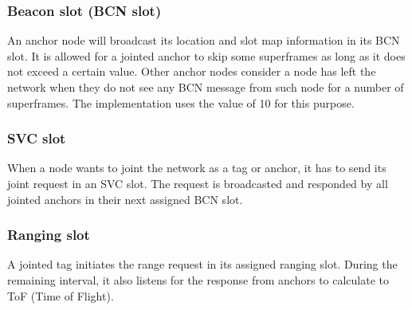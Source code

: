 \documentclass[../../main.tex]{subfiles}
\begin{document}
\subsubsection{Beacon slot (BCN slot)}
An anchor node will broadcast its location and slot map information in its BCN slot. It is allowed for a jointed anchor to skip some superframes as long as it does not exceed a certain value. Other anchor nodes consider a node has left the network when they do not see any BCN message from such node for a number of superframes. The implementation uses the value of 10 for this purpose.
\subsubsection{SVC slot}
When a node wants to joint the network as a tag or anchor, it has to send its joint request in an SVC slot. The request is broadcasted and responded by all jointed anchors in their next assigned BCN slot.
\subsubsection{Ranging slot}
A jointed tag initiates the range request in its assigned ranging slot. During the remaining interval, it also listens for the response from anchors to calculate to ToF (Time of Flight).
\end{document}
